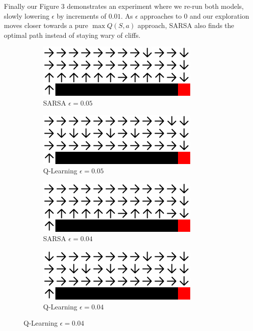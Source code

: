 \documentclass{article}
\begin{document}
Finally our Figure 3 demonstrates an experiment where we re-run both models, slowly lowering $\epsilon$ by increments of $0.01$. As $\epsilon$ approaches to $0$ and our exploration moves closer towards a pure $\max Q(S,a)$ approach, SARSA also finds the optimal path instead of staying wary of cliffs.

\begin{figure}
    \begin{subfigure}{.5\textwidth}
        \centering
        \includegraphics[width=.8\linewidth]{imgs/sarsa_epsilon_0.05.png}
        \caption{SARSA $\epsilon=0.05$}
    \end{subfigure}
    \begin{subfigure}{.5\textwidth}
        \centering
        \includegraphics[width=.8\linewidth]{imgs/qlearning_epsilon_0.05.png}
        \caption{Q-Learning $\epsilon=0.05$}
    \end{subfigure}

    \begin{subfigure}{.5\textwidth}
        \centering
        \includegraphics[width=.8\linewidth]{imgs/sarsa_epsilon_0.04.png}
        \caption{SARSA $\epsilon=0.04$}
    \end{subfigure}
    \begin{subfigure}{.5\textwidth}
        \centering
        \includegraphics[width=.8\linewidth]{imgs/qlearning_epsilon_0.04.png}
        \caption{Q-Learning $\epsilon=0.04$}
    \end{subfigure}


\end{figure}
\end{document}
